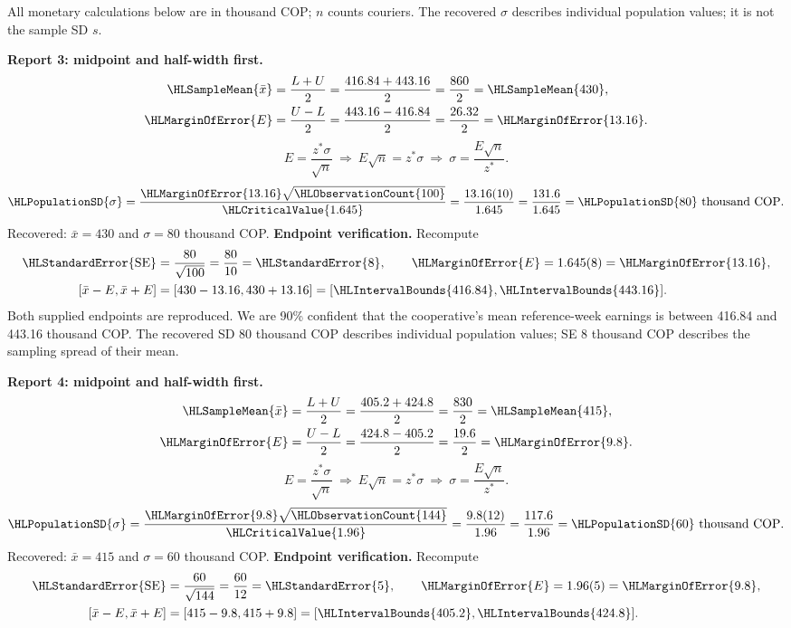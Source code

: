 All monetary calculations below are in thousand COP; $n$ counts couriers. The recovered $\sigma$ describes individual population values; it is not the sample SD $s$.
\par\noindent\textbf{Report 3: midpoint and half-width first.}
\[\begin{aligned}
\HLSampleMean{\bar x}&=\frac{L+U}{2}=\frac{416.84+443.16}{2}=\frac{860}{2}=\HLSampleMean{430},\\
\HLMarginOfError{E}&=\frac{U-L}{2}=\frac{443.16-416.84}{2}=\frac{26.32}{2}=\HLMarginOfError{13.16}.
\end{aligned}\]
\[E=\frac{z^*\sigma}{\sqrt n}\ \Longrightarrow\ E\sqrt n=z^*\sigma\ \Longrightarrow\ \sigma=\frac{E\sqrt n}{z^*}.\]
\[\HLPopulationSD{\sigma}=\frac{\HLMarginOfError{13.16}\sqrt{\HLObservationCount{100}}}{\HLCriticalValue{1.645}}=\frac{13.16(10)}{1.645}=\frac{131.6}{1.645}=\HLPopulationSD{80}\text{ thousand COP}.\]
Recovered: $\bar x=430$ and $\sigma=80$ thousand COP.
\textbf{Endpoint verification.} Recompute
\[\begin{aligned}
\HLStandardError{\mathrm{SE}}&=\frac{80}{\sqrt{100}}=\frac{80}{10}=\HLStandardError{8},\qquad \HLMarginOfError{E}=1.645(8)=\HLMarginOfError{13.16},\\
[\bar x-E,\bar x+E]&=[430-13.16,430+13.16]=[\HLIntervalBounds{416.84},\HLIntervalBounds{443.16}].
\end{aligned}\]
Both supplied endpoints are reproduced. We are 90\% confident that the cooperative's mean reference-week earnings is between 416.84 and 443.16 thousand COP.
The recovered SD 80 thousand COP describes individual population values; SE 8 thousand COP describes the sampling spread of their mean.
\par\noindent\textbf{Report 4: midpoint and half-width first.}
\[\begin{aligned}
\HLSampleMean{\bar x}&=\frac{L+U}{2}=\frac{405.2+424.8}{2}=\frac{830}{2}=\HLSampleMean{415},\\
\HLMarginOfError{E}&=\frac{U-L}{2}=\frac{424.8-405.2}{2}=\frac{19.6}{2}=\HLMarginOfError{9.8}.
\end{aligned}\]
\[E=\frac{z^*\sigma}{\sqrt n}\ \Longrightarrow\ E\sqrt n=z^*\sigma\ \Longrightarrow\ \sigma=\frac{E\sqrt n}{z^*}.\]
\[\HLPopulationSD{\sigma}=\frac{\HLMarginOfError{9.8}\sqrt{\HLObservationCount{144}}}{\HLCriticalValue{1.96}}=\frac{9.8(12)}{1.96}=\frac{117.6}{1.96}=\HLPopulationSD{60}\text{ thousand COP}.\]
Recovered: $\bar x=415$ and $\sigma=60$ thousand COP.
\textbf{Endpoint verification.} Recompute
\[\begin{aligned}
\HLStandardError{\mathrm{SE}}&=\frac{60}{\sqrt{144}}=\frac{60}{12}=\HLStandardError{5},\qquad \HLMarginOfError{E}=1.96(5)=\HLMarginOfError{9.8},\\
[\bar x-E,\bar x+E]&=[415-9.8,415+9.8]=[\HLIntervalBounds{405.2},\HLIntervalBounds{424.8}].
\end{aligned}\]
